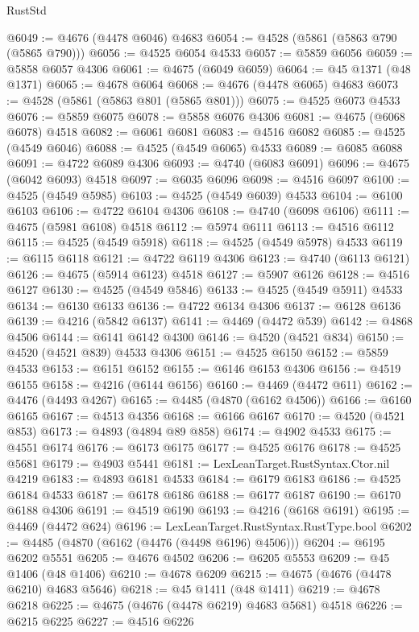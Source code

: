 \begin{lexlean}{RustStd}
\begin{coremodule}
{\begin{coremodule}
{{{{{{{{{{{{{{{{{{{{{{{{{{{{{{{{{{{{{{{{{{{{{{{{{{{{{{{{{{{{@6049 := @4676 (@4478 @6046) @4683
@6054 := @4528 (@5861 (@5863 @790 (@5865 @790)))
@6056 := @4525 @6054 @4533
@6057 := @5859 @6056
@6059 := @5858 @6057 @4306
@6061 := @4675 (@6049 @6059)
@6064 := @45 @1371 (@48 @1371)
@6065 := @4678 @6064
@6068 := @4676 (@4478 @6065) @4683
@6073 := @4528 (@5861 (@5863 @801 (@5865 @801)))
@6075 := @4525 @6073 @4533
@6076 := @5859 @6075
@6078 := @5858 @6076 @4306
@6081 := @4675 (@6068 @6078) @4518
@6082 := @6061 @6081
@6083 := @4516 @6082
@6085 := @4525 (@4549 @6046)
@6088 := @4525 (@4549 @6065) @4533
@6089 := @6085 @6088
@6091 := @4722 @6089 @4306
@6093 := @4740 (@6083 @6091)
@6096 := @4675 (@6042 @6093) @4518
@6097 := @6035 @6096
@6098 := @4516 @6097
@6100 := @4525 (@4549 @5985)
@6103 := @4525 (@4549 @6039) @4533
@6104 := @6100 @6103
@6106 := @4722 @6104 @4306
@6108 := @4740 (@6098 @6106)
@6111 := @4675 (@5981 @6108) @4518
@6112 := @5974 @6111
@6113 := @4516 @6112
@6115 := @4525 (@4549 @5918)
@6118 := @4525 (@4549 @5978) @4533
@6119 := @6115 @6118
@6121 := @4722 @6119 @4306
@6123 := @4740 (@6113 @6121)
@6126 := @4675 (@5914 @6123) @4518
@6127 := @5907 @6126
@6128 := @4516 @6127
@6130 := @4525 (@4549 @5846)
@6133 := @4525 (@4549 @5911) @4533
@6134 := @6130 @6133
@6136 := @4722 @6134 @4306
@6137 := @6128 @6136
@6139 := @4216 (@5842 @6137)
@6141 := @4469 (@4472 @539)
@6142 := @4868 @4506
@6144 := @6141 @6142 @4300
@6146 := @4520 (@4521 @834)
@6150 := @4520 (@4521 @839) @4533 @4306
@6151 := @4525 @6150
@6152 := @5859 @4533
@6153 := @6151 @6152
@6155 := @6146 @6153 @4306
@6156 := @4519 @6155
@6158 := @4216 (@6144 @6156)
@6160 := @4469 (@4472 @611)
@6162 := @4476 (@4493 @4267)
@6165 := @4485 (@4870 (@6162 @4506))
@6166 := @6160 @6165
@6167 := @4513 @4356
@6168 := @6166 @6167
@6170 := @4520 (@4521 @853)
@6173 := @4893 (@4894 @89 @858)
@6174 := @4902 @4533
@6175 := @4551 @6174
@6176 := @6173 @6175
@6177 := @4525 @6176
@6178 := @4525 @5681
@6179 := @4903 @5441
@6181 := LexLeanTarget.RustSyntax.Ctor.nil @4219
@6183 := @4893 @6181 @4533
@6184 := @6179 @6183
@6186 := @4525 @6184 @4533
@6187 := @6178 @6186
@6188 := @6177 @6187
@6190 := @6170 @6188 @4306
@6191 := @4519 @6190
@6193 := @4216 (@6168 @6191)
@6195 := @4469 (@4472 @624)
@6196 := LexLeanTarget.RustSyntax.RustType.bool
@6202 := @4485 (@4870 (@6162 (@4476 (@4498 @6196) @4506)))
@6204 := @6195 @6202 @5551
@6205 := @4676 @4502
@6206 := @6205 @5553
@6209 := @45 @1406 (@48 @1406)
@6210 := @4678 @6209
@6215 := @4675 (@4676 (@4478 @6210) @4683 @5646)
@6218 := @45 @1411 (@48 @1411)
@6219 := @4678 @6218
@6225 := @4675 (@4676 (@4478 @6219) @4683 @5681) @4518
@6226 := @6215 @6225
@6227 := @4516 @6226
}}}}}}}}}}}}}}}}}}}}}}}}}}}}}}}}}}}}}}}}}}}}}}}}}}}}}}}}}}}}
\end{coremodule}}
\end{coremodule}
\end{lexlean}
